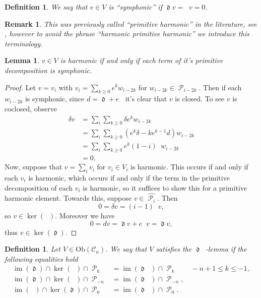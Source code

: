 \documentclass{amsart}
\newtheorem{lemma}[theorem]{Lemma}
\newtheorem{definition}[theorem]{Definition}
\newtheorem{remark}[theorem]{Remark}
\DeclareMathOperator{\dee}{\mathfrak{d}}
\DeclareMathOperator{\deebar}{\overline{\mathfrak{d}}}
\DeclareMathOperator{\Prim}{\mathcal{P}}
\theoremstyle{definition}
\DeclareMathOperator{\im}{im}
\begin{document}
\begin{definition}
    We say that $v \in V$ is ``symphonic'' if $\dee v = \deebar v =0$.
\end{definition}
\begin{remark}
This was previously called ``primitive harmonic'' in the literature, see \cite{HoSym}, however to avoid the phrase ``harmonic primitive harmonic'' we introduce this terminology.
\end{remark}
\begin{lemma}
    $v \in V$ is harmonic if and only if each term of it's primitive decomposition is symphonic.
\end{lemma}
\begin{proof}
    Let $v = v_i$ with $v_i = \sum_{k \geq 0} e^k w_{i-2k}$ for $w_{i-2k} \in \Prim_{i-2k}$. Then if each $w_{i-2k}$ is symphonic, since $d =\dee  + e\deebar$ it's clear that $v$ is closed. To see $v$ is coclosed, observe
    \begin{align*}
        \delta v &= \sum_i \sum_{k \geq 0}\delta e^k w_{i-2k} \\
                 &= \sum_i \sum_{k \geq 0} (e^k\delta - ke^{k-1}d)w_{i-2k} \\
                 &= \sum_i \sum_{k \geq 0} e^k (1-i)\deebar w_{i-2k} \\
                 &=0.
    \end{align*}
    Now, suppose that $v =\sum_i v_i$ for $v_i \in V_i$ is harmonic. This occurs if and only if each $v_i$ is harmonic, which occurs if and only if the term in the primitive decomposition of each $v_i$ is harmonic, so it suffices to show this for a primitive harmonic element. Towards this, suppose $v \in \widehat{\Prim_i}$. Then
    \begin{equation*}
        0=\delta v = (i-1) \deebar v,
    \end{equation*}
    so $v \in \ker(\deebar)$. Moreover we have
    \begin{equation*}
        0 = dv = \dee v + e\deebar v = \dee v,
    \end{equation*}
    thus $v \in \ker( \dee)$.
\end{proof}
\begin{definition}
    Let $V \in \mathrm{Ob}(\mathscr{C}_n)$. We say that $V$ satisfies the $\dee \deebar$-lemma if the following equalities hold
    \begin{align*}
        \im(\dee) \cap \ker(\deebar) \cap \Prim_k &= \im(\dee\deebar) \cap \Prim_k \qquad -n+1 \leq k \leq -1, \\
        \im(\dee) \cap \ker(\deebar) \cap \Prim_{-n}&= \im(\dee \deebar)\cap \Prim_{-n}, \\
        \im(\deebar) \cap \ker(\dee) \cap \Prim_0 &= \im(\dee \deebar) \cap \Prim_0.
    \end{align*}
\end{definition}
\end{document}

